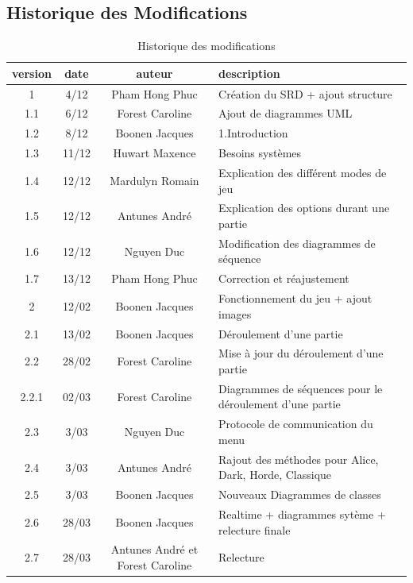 \documentclass[10pt, a4paper]{article}
\begin{document}
		\subsection{Historique des Modifications}

		\begin{table}[h!]

			\centering

			\begin{tabular}{|c|c|c|p{50mm}|}
				\hline
				 \textbf{version} & \textbf{date} & \textbf{auteur}  & \textbf{description} \\ \hline
				 1 & 4/12 & Pham Hong Phuc & Création du SRD + ajout structure\\
				 1.1 & 6/12 & Forest Caroline & Ajout de diagrammes UML\\
				 1.2 & 8/12 & Boonen Jacques & 1.Introduction\\
				 1.3 & 11/12 & Huwart Maxence & Besoins systèmes\\
				 1.4 & 12/12 & Mardulyn Romain & Explication des différent modes de jeu\\
				 1.5 & 12/12 & Antunes André & Explication des options durant une partie\\
         1.6 & 12/12 & Nguyen Duc & Modification des diagrammes de séquence\\
         1.7 & 13/12 & Pham Hong Phuc & Correction et réajustement \\ \hline
				 2 & 12/02 & Boonen Jacques & Fonctionnement du jeu + ajout images \\
				 2.1 & 13/02 & Boonen Jacques & Déroulement d'une partie \\
				 2.2 & 28/02 & Forest Caroline & Mise à jour du déroulement d'une partie \\
				 2.2.1 & 02/03 & Forest Caroline & Diagrammes de séquences pour le déroulement d'une partie \\
				 2.3 & 3/03 & Nguyen Duc & Protocole de communication du menu \\
				 2.4 & 3/03 & Antunes André & Rajout des méthodes pour Alice, Dark, Horde, Classique \\
				 2.5 & 3/03 & Boonen Jacques & Nouveaux Diagrammes de classes \\
				 2.6 & 28/03 & Boonen Jacques & Realtime + diagrammes sytème + relecture finale \\
				 2.7 & 28/03 & Antunes André et Forest Caroline & Relecture \\
				\hline
\end{tabular}
			\caption*{Historique des modifications}
			\end{table}
\clearpage
\end{document}

